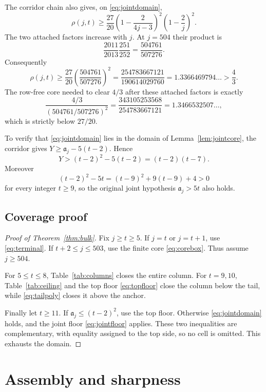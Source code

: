 \documentclass[11pt,a4paper]{article}
\theoremstyle{plain}
\theoremstyle{remark}
\newcommand{\level}{\mathfrak a}
\begin{document}
The corridor chain also gives, on \eqref{eq:jointdomain},
\begin{equation}\label{eq:attached}
 \rho(j,t)\ge\frac{27}{20}
 \left(1-\frac2{4j-3}\right)^2
 \left(1-\frac2j\right)^2.
\end{equation}
The two attached factors increase with $j$.  At $j=504$ their product is
\[
 \frac{2011}{2013}\frac{251}{252}
 =\frac{504761}{507276}.
\]
Consequently
\begin{equation}\label{eq:jointfloor}
 \rho(j,t)\ge
 \frac{27}{20}\left(\frac{504761}{507276}\right)^2
 =\frac{254783667121}{190614029760}
 =1.3366469794\ldots>\frac43.
\end{equation}
The row-free core needed to clear $4/3$ after these attached factors is exactly
\[
 \frac{4/3}{(504761/507276)^2}
 =\frac{343105253568}{254783667121}
 =1.3466532507\ldots,
\]
which is strictly below $27/20$.

To verify that \eqref{eq:jointdomain} lies in the domain of
Lemma~\ref{lem:jointcore}, the corridor gives
$Y\ge\level_j-5(t-2)$.  Hence
\[
 Y>(t-2)^2-5(t-2)=(t-2)(t-7).
\]
Moreover
\begin{equation}\label{eq:dichotomyidentity}
 (t-2)^2-5t=(t-9)^2+9(t-9)+4>0
\end{equation}
for every integer $t\ge9$, so the original joint hypothesis
$\level_j>5t$ also holds.

\subsection{Coverage proof}

\begin{proof}[Proof of Theorem~\ref{thm:bulk}]
Fix $j\ge t\ge5$.  If $j=t$ or $j=t+1$, use
\eqref{eq:terminal}.  If $t+2\le j\le503$, use the finite core
\eqref{eq:corebox}.  Thus assume $j\ge504$.

For $5\le t\le8$, Table~\ref{tab:columns} closes the entire column.  For
$t=9,10$, Table~\ref{tab:ceiling} and the top floor
\eqref{eq:topfloor} close the column below the tail, while
\eqref{eq:tailpoly} closes it above the anchor.

Finally let $t\ge11$.  If $\level_j\le(t-2)^2$, use the top floor.  Otherwise
\eqref{eq:jointdomain} holds, and the joint floor \eqref{eq:jointfloor}
applies.  These two inequalities are complementary, with equality assigned
to the top side, so no cell is omitted.  This exhausts the domain.
\end{proof}

\section{Assembly and sharpness}\label{sec:assembly}
\end{document}

